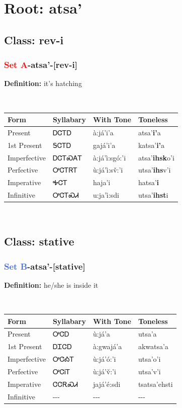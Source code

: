 \needspace{4in}
\section*{Root: atsa'}
\nopagebreak
{}
\needspace{3in}
\subsection*{Class: rev-i}
\nopagebreak
\needspace{2in}
\subsubsection*{\textcolor{Red}{Set A}{-}\textbf{atsa'}{-}[rev-i]}
\nopagebreak
\textbf{Definition: } it{\textquoteright}s hatching
\\[0.5em]
\begin{tabularx}{\textwidth}{l X X X}%
\toprule%
\textbf{Form}&\textbf{Syllabary}&\textbf{With Tone}&\textbf{Toneless}\\%
\midrule%
Present&ᎠᏣᎢᎠ&à:já’i’a&atsa'\textbf{i'}a\\%
1st Present&ᎦᏣᎢᎠ&gajá’i’a&katsa'\textbf{i'}a\\%
Imperfective&ᎠᏣᎢᏍᎪᎢ&à:já’ì:sgó:’i&atsa'\textbf{ihsk}o'i\\%
Perfective&ᎤᏣᎢᏒᎢ&ù:já’ì:sv̌:’i&utsa'\textbf{ihs}v'i\\%
Imperative&ᎭᏣᎢ&haja’i&hatsa'\textbf{i}\\%
Infinitive&ᎤᏣᎢᏍᏗ&u:ja’ì:sdi&utsa'\textbf{ihst}i\\%
\bottomrule%
\end{tabularx}
\\[1em]
\needspace{3in}
\subsection*{Class: stative}
\nopagebreak
\needspace{2in}
\subsubsection*{\textcolor{RoyalBlue}{Set B}{-}\textbf{atsa'}{-}[stative]}
\nopagebreak
\textbf{Definition: } he/she is inside it
\\[0.5em]
\begin{tabularx}{\textwidth}{l X X X}%
\toprule%
\textbf{Form}&\textbf{Syllabary}&\textbf{With Tone}&\textbf{Toneless}\\%
\midrule%
Present&ᎤᏣᎠ&ù:já’a&utsa'a\\%
1st Present&ᎠᏆᏣᎠ&à:gwajá’a&akwatsa'a\\%
Imperfective&ᎤᏣᎣᎢ&ù:já’ó:’i&utsa'o'i\\%
Perfective&ᎤᏣᎥᎢ&ù:já’v̌:’i&utsa'v'i\\%
Imperative&ᏣᏣᎡᏍᏗ&jajá’é:sdi&tsatsa'ehsti\\%
Infinitive&{-}{-}{-}&{-}{-}{-}&{-}{-}{-}\\%
\bottomrule%
\end{tabularx}
\\[1em]